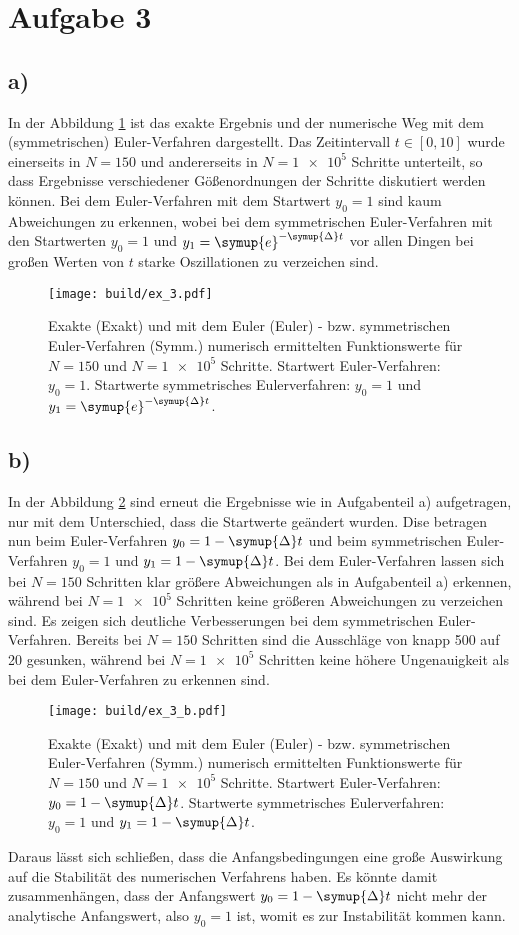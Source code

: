 \section*{Aufgabe 3}
\subsection*{a)}
In der Abbildung \ref{fig:euler} ist das exakte Ergebnis und der numerische Weg mit dem (symmetrischen)
Euler-Verfahren dargestellt.
Das Zeitintervall $t \in [0, 10]$ wurde einerseits in $N = 150$ und andererseits in $N = \num{1e5}$ Schritte 
unterteilt, so dass Ergebnisse verschiedener Gößenordnungen der Schritte diskutiert werden können.
Bei dem Euler-Verfahren mit dem Startwert $y_0 = 1$ sind kaum Abweichungen zu erkennen, wobei 
bei dem symmetrischen Euler-Verfahren mit den Startwerten $y_0 = 1$ und $y_1 = \symup{e}^{-\symup{\Delta}t}$ vor allen Dingen bei großen Werten von $t$ 
starke Oszillationen zu verzeichen sind.
\begin{figure}
    \centering
    \texttt{[image: build/ex\_3.pdf]}
    \caption{Exakte (Exakt) und mit dem Euler (Euler) - bzw. symmetrischen Euler-Verfahren (Symm.) numerisch ermittelten Funktionswerte für
    $N = 150$ und $N = \num{1e5}$ Schritte. 
    Startwert Euler-Verfahren: $y_0 = 1$. Startwerte symmetrisches Eulerverfahren: $y_0 = 1$ und $y_1 = \symup{e}^{-\symup{\Delta}t}$.}
    \label{fig:euler}
\end{figure} 
\subsection*{b)}
In der Abbildung \ref{fig:euler_b} sind erneut die Ergebnisse wie in Aufgabenteil a) aufgetragen, nur mit dem Unterschied, dass 
die Startwerte geändert wurden.
Dise betragen nun beim Euler-Verfahren $y_0 = 1 - \symup{\Delta}t$ und beim symmetrischen Euler-Verfahren 
$y_0 = 1$ und $y_1 = 1 - \symup{\Delta}t$.
Bei dem Euler-Verfahren lassen sich bei $N=150$ Schritten klar größere Abweichungen als in Aufgabenteil a) erkennen, während bei $N = \num{1e5}$
Schritten keine größeren Abweichungen zu verzeichen sind.
Es zeigen sich deutliche Verbesserungen bei dem symmetrischen Euler-Verfahren. 
Bereits bei $N = 150$ Schritten sind die Ausschläge von knapp 500 auf 20 gesunken, 
während bei $N = \num{1e5}$ Schritten keine höhere Ungenauigkeit als bei dem Euler-Verfahren zu erkennen sind.
\begin{figure}
    \centering
    \texttt{[image: build/ex\_3\_b.pdf]}
    \caption{Exakte (Exakt) und mit dem Euler (Euler) - bzw. symmetrischen Euler-Verfahren (Symm.) numerisch ermittelten Funktionswerte für
    $N = 150$ und $N = \num{1e5}$ Schritte.
    Startwert Euler-Verfahren: $y_0 = 1 - \symup{\Delta}t$. 
    Startwerte symmetrisches Eulerverfahren: $y_0 = 1$ und $y_1 = 1 - \symup{\Delta}t$.}
    \label{fig:euler_b}
\end{figure}
Daraus lässt sich schließen, dass die Anfangsbedingungen eine große Auswirkung auf die Stabilität des numerischen Verfahrens haben.
Es könnte damit zusammenhängen, dass der Anfangswert $y_0 = 1 - \symup{\Delta}t$ nicht mehr der analytische Anfangswert, also 
$y_0 = 1$ ist, womit es zur Instabilität kommen kann.